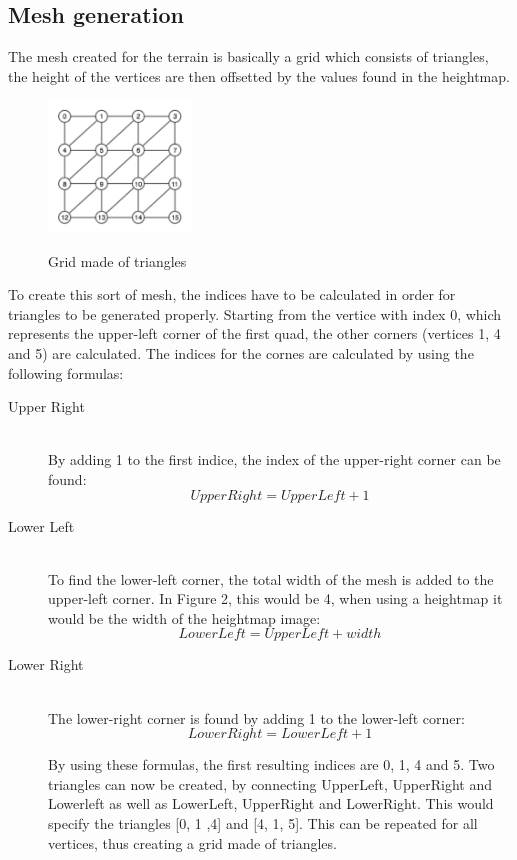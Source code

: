 \documentclass[conference]{acmsiggraph}
\begin{document}
\subsection{Mesh generation}
The mesh created for the terrain is basically a grid which consists of triangles, the height of the vertices are then offsetted by the values found in the heightmap.

 \begin{figure}[ht]
   \centering
   \includegraphics[width=1.5in]{images/terrain_grid}
   \caption{Grid made of triangles}\cite{TerrainGrid}
 \end{figure}

To create this sort of mesh, the indices have to be calculated in order for triangles to be generated properly. Starting from the vertice with index 0, which represents the upper-left corner of the first quad, the other corners (vertices 1, 4 and 5) are calculated. The indices for the cornes are calculated by using the following formulas:

\begin{description}
  \item[Upper Right] \hfill \\
  By adding 1 to the first indice, the index of the upper-right corner can be found:
\begin{equation}
UpperRight = UpperLeft + 1
\end{equation}
  \item[Lower Left] \hfill \\
  To find the lower-left corner, the total width of the mesh is added to the upper-left corner. In Figure 2, this would be 4, when using a heightmap it would be the width of the heightmap image:
\begin{equation}
LowerLeft = UpperLeft + width
\end{equation}
  \item[Lower Right] \hfill \\
The lower-right corner is found by adding 1 to the lower-left corner:
\begin{equation}
LowerRight = LowerLeft + 1
\end{equation}

By using these formulas, the first resulting indices are 0, 1, 4 and 5. Two triangles can now be created, by connecting UpperLeft, UpperRight and Lowerleft as well as LowerLeft, UpperRight and LowerRight. This would specify the triangles [0, 1 ,4] and [4, 1, 5]. This can be repeated for all vertices, thus creating a grid made of triangles. 
  
\end{description}
\end{document}
